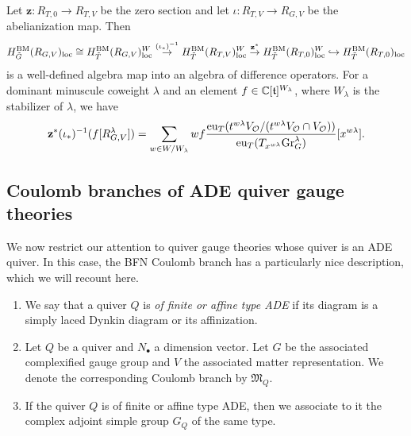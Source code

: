 \begin{prop}
	Let $\mathbf{z} \colon R_{T,0} \to R_{T,V}$ be the zero section and let $\iota\colon R_{T,V} \to R_{G,V}$ be the abelianization map. Then
	\begin{equation}
		H_{\tilde G}^\textup{BM}(R_{G,V})_\textup{loc} \cong H_{\tilde T}^\textup{BM}(R_{G,V})_\textup{loc}^W \overset{(\iota_*)^{-1}}{\to} H_{\tilde T}^\textup{BM}(R_{T,V})_\textup{loc}^W \overset{\mathbf{z}^*}{\to} H_{\tilde T}^\textup{BM}(R_{T,0})_\textup{loc}^W \hookrightarrow H_{\tilde T}^\textup{BM}(R_{T,0})_\textup{loc}
	\end{equation}
	is a well-defined algebra map into an algebra of difference operators. For a dominant minuscule coweight $\lambda$ and an element $f \in \mathbb{C}[\mathfrak{t}]^{W_\lambda}$, where $W_\lambda$ is the stabilizer of $\lambda$, we have
	\begin{equation}
		\mathbf{z}^* (\iota_*)^{-1}(f [R_{G,V}^\lambda]) = \sum_{w \in W/W_\lambda} wf \frac{\operatorname{eu}_T(t^{w\lambda} V_\mathcal{O}/(t^{w\lambda} V_\mathcal{O} \cap V_\mathcal{O}))}{\operatorname{eu}_T(T_{x^{w\lambda}} \textup{Gr}_G^\lambda)} [x^{w\lambda}].
	\end{equation}
\end{prop}

\subsection{Coulomb branches of ADE quiver gauge theories}

We now restrict our attention to quiver gauge theories whose quiver is an ADE quiver. In this case, the BFN Coulomb branch has a particularly nice description, which we will recount here.

\begin{definition}
	\begin{enumerate}[label=(\roman*)]
		\item We say that a quiver $Q$ is \emph{of finite or affine type ADE} if its diagram is a simply laced Dynkin diagram or its affinization.
		\item Let $Q$ be a quiver and $N_\bullet$ a dimension vector. Let $G$ be the associated complexified gauge group and $V$ the associated matter representation. We denote the corresponding Coulomb branch by $\mathfrak{M}_Q$.
		\item If the quiver $Q$ is of finite or affine type ADE, then we associate to it the complex adjoint simple group $G_Q$ of the same type.
	\end{enumerate}
\end{definition}


